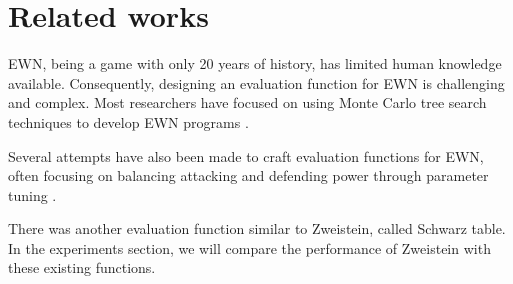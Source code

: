 \section{Related works}
EWN, being a game with only 20 years of history, has limited human knowledge available. Consequently, designing an evaluation function for EWN is challenging and complex. Most researchers have focused on using Monte Carlo tree search techniques to develop EWN programs \cite{EWN_perfect_information} \cite{TAAI_MCTS} \cite{china_MCTS} \cite{monte_alpha}.

    Several attempts have also been made to craft evaluation functions for EWN, often focusing on balancing attacking and defending power through parameter tuning \cite{EWNNY} \cite{ODEMA}.

    There was another evaluation function similar to Zweistein, called Schwarz table. \cite{Schwarz} In the experiments section, we will compare the performance of Zweistein with these existing functions.